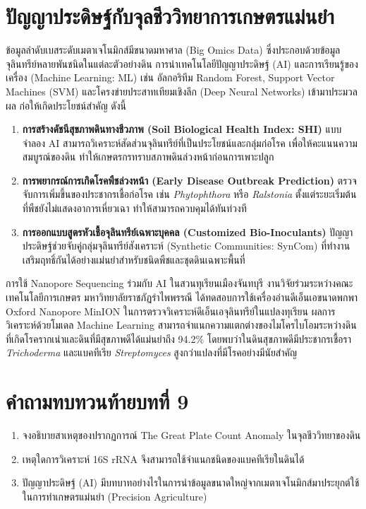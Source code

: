 \section{ปัญญาประดิษฐ์กับจุลชีววิทยาการเกษตรแม่นยำ}

ข้อมูลลำดับเบสระดับเมตาเจโนมิกส์มีขนาดมหาศาล (Big Omics Data) ซึ่งประกอบด้วยข้อมูลจุลินทรีย์หลายพันชนิดในแต่ละตัวอย่างดิน การนำเทคโนโลยีปัญญาประดิษฐ์ (AI) และการเรียนรู้ของเครื่อง (Machine Learning: ML) เช่น อัลกอริทึม Random Forest, Support Vector Machines (SVM) และโครงข่ายประสาทเทียมเชิงลึก (Deep Neural Networks) เข้ามาประมวลผล ก่อให้เกิดประโยชน์สำคัญ ดังนี้
\begin{enumerate}
    \item \textbf{การสร้างดัชนีสุขภาพดินทางชีวภาพ (Soil Biological Health Index: SHI)} แบบจำลอง AI สามารถวิเคราะห์สัดส่วนจุลินทรีย์ที่เป็นประโยชน์และกลุ่มก่อโรค เพื่อให้คะแนนความสมบูรณ์ของดิน ทำให้เกษตรกรทราบสภาพดินล่วงหน้าก่อนการเพาะปลูก
    \item \textbf{การพยากรณ์การเกิดโรคพืชล่วงหน้า (Early Disease Outbreak Prediction)} ตรวจจับการเพิ่มขึ้นของประชากรเชื้อก่อโรค เช่น \textit{Phytophthora} หรือ \textit{Ralstonia} ตั้งแต่ระยะเริ่มต้นที่พืชยังไม่แสดงอาการเหี่ยวเฉา ทำให้สามารถควบคุมได้ทันท่วงที
    \item \textbf{การออกแบบสูตรหัวเชื้อจุลินทรีย์เฉพาะบุคคล (Customized Bio-Inoculants)} ปัญญาประดิษฐ์ช่วยจับคู่กลุ่มจุลินทรีย์สังเคราะห์ (Synthetic Communities: SynCom) ที่ทำงานเสริมฤทธิ์กันได้อย่างแม่นยำสำหรับชนิดพืชและชุดดินเฉพาะพื้นที่
\end{enumerate}

\begin{casestudy}{การใช้ Nanopore Sequencing ร่วมกับ AI ในสวนทุเรียนเมืองจันทบุรี}
งานวิจัยร่วมระหว่างคณะเทคโนโลยีการเกษตร มหาวิทยาลัยราชภัฏรำไพพรรณี ได้ทดสอบการใช้เครื่องอ่านดีเอ็นเอขนาดพกพา Oxford Nanopore MinION ในการตรวจวิเคราะห์ดีเอ็นเอจุลินทรีย์ในแปลงทุเรียน ผลการวิเคราะห์ด้วยโมเดล Machine Learning สามารถจำแนกความแตกต่างของไมโครไบโอมระหว่างดินที่เกิดโรครากเน่าและดินที่มีสุขภาพดีได้แม่นยำถึง 94.2\% โดยพบว่าในดินสุขภาพดีมีประชากรเชื้อรา \textit{Trichoderma} และแบคทีเรีย \textit{Streptomyces} สูงกว่าแปลงที่มีโรคอย่างมีนัยสำคัญ
\end{casestudy}

\section*{คำถามทบทวนท้ายบทที่ 9}
\begin{enumerate}
    \item จงอธิบายสาเหตุของปรากฏการณ์ The Great Plate Count Anomaly ในจุลชีววิทยาของดิน
    \item เหตุใดการวิเคราะห์ 16S rRNA จึงสามารถใช้จำแนกชนิดของแบคทีเรียในดินได้
    \item ปัญญาประดิษฐ์ (AI) มีบทบาทอย่างไรในการนำข้อมูลขนาดใหญ่จากเมตาเจโนมิกส์มาประยุกต์ใช้ในการทำเกษตรแม่นยำ (Precision Agriculture)
\end{enumerate}

\clearpage